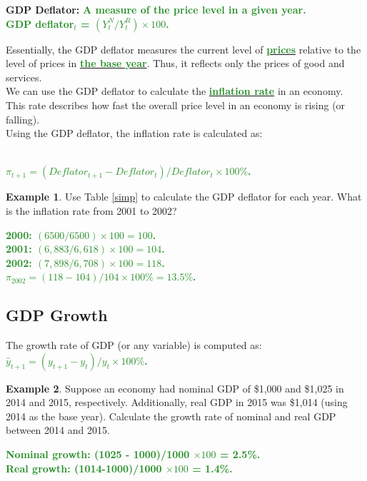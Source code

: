 \documentclass[11pt]{article}\usepackage[]{graphicx}\usepackage[]{color}
\theoremstyle{definition}
\newtheorem{exmp}{Example}[section]
\newcommand{\blank}[1]{}
\newcommand{\ddp}[1]{{\textbf{\textcolor{ForestGreen}{#1}}}}
\newcommand{\dd}[1]{{\underline{\textbf{\textcolor{ForestGreen}{#1}}}}}
\newcommand{\defn}[1]{\textbf{#1}}
\begin{document}
\defn{GDP Deflator:} \ddp{A measure of the price level in a given year. \\ GDP deflator$_t$ = $(Y^N_t/Y^R_t) \times 100$.\\}

Essentially, the GDP deflator measures the current level of \dd{prices} relative to the level of prices in \dd{the base year}. Thus, it reflects only the prices of good and services.
\\

We can use the GDP deflator to calculate the \dd{inflation rate} in an economy. This rate describes how fast the overall price level in an economy is rising (or falling). 
\\

Using the GDP deflator, the inflation rate is calculated as:

\ddp{\\ $\pi_{t+1} = (Deflator_{t+1} - Deflator_t)/Deflator_t \times 100\%$.}



\begin{exmp} 
	Use Table \ref{simp} to calculate the GDP deflator for each year. What is the inflation rate from 2001 to 2002?
\end{exmp}
\ddp{2000: $(6500/6500)\times 100 = 100$. \\
	2001: $(6,883/6,618)\times 100 = 104$. \\
	2002: $(7,898/6,708)\times 100 = 118$. \\
	$\pi_{2002} = (118-104)/104\times 100\% = 13.5\%$.}
\blank{}
\blank{}
\blank{}

\subsection{GDP Growth}

The growth rate of GDP (or any variable) is computed as: \ddp{$\hat{y}_{t+1} = (y_{t+1} - y_t)/y_t \times 100\%$.}


\begin{exmp} 
	Suppose an economy had nominal GDP of \$1,000 and \$1,025 in 2014 and 2015, respectively. Additionally, real GDP in 2015 was \$1,014 (using 2014 as the base year). Calculate the growth rate of nominal and real GDP between 2014 and 2015. 
\end{exmp}
\blank{}
\blank{}

\ddp{Nominal growth: (1025 - 1000)/1000 $\times 100$ = 2.5\%. \\
	Real growth: (1014-1000)/1000 $\times 100$ = 1.4\%. }
\end{document}

